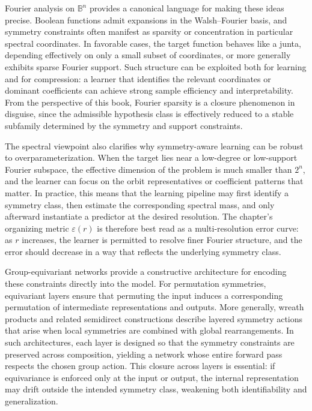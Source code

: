 \documentclass[11pt]{article}
\begin{document}
Fourier analysis on \(\mathbb{B}^n\) provides a canonical language for making these ideas precise. Boolean functions admit expansions in the Walsh--Fourier basis, and symmetry constraints often manifest as sparsity or concentration in particular spectral coordinates. In favorable cases, the target function behaves like a junta, depending effectively on only a small subset of coordinates, or more generally exhibits sparse Fourier support. Such structure can be exploited both for learning and for compression: a learner that identifies the relevant coordinates or dominant coefficients can achieve strong sample efficiency and interpretability. From the perspective of this book, Fourier sparsity is a closure phenomenon in disguise, since the admissible hypothesis class is effectively reduced to a stable subfamily determined by the symmetry and support constraints.

The spectral viewpoint also clarifies why symmetry-aware learning can be robust to overparameterization. When the target lies near a low-degree or low-support Fourier subspace, the effective dimension of the problem is much smaller than \(2^n\), and the learner can focus on the orbit representatives or coefficient patterns that matter. In practice, this means that the learning pipeline may first identify a symmetry class, then estimate the corresponding spectral mass, and only afterward instantiate a predictor at the desired resolution. The chapter's organizing metric \(\varepsilon(r)\) is therefore best read as a multi-resolution error curve: as \(r\) increases, the learner is permitted to resolve finer Fourier structure, and the error should decrease in a way that reflects the underlying symmetry class.

Group-equivariant networks provide a constructive architecture for encoding these constraints directly into the model. For permutation symmetries, equivariant layers ensure that permuting the input induces a corresponding permutation of intermediate representations and outputs. More generally, wreath products and related semidirect constructions describe layered symmetry actions that arise when local symmetries are combined with global rearrangements. In such architectures, each layer is designed so that the symmetry constraints are preserved across composition, yielding a network whose entire forward pass respects the chosen group action. This closure across layers is essential: if equivariance is enforced only at the input or output, the internal representation may drift outside the intended symmetry class, weakening both identifiability and generalization.
\end{document}
